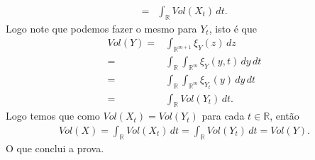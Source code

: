 \begin{homeworkProblem}[Seção 4-4]
\begin{solution}
\begin{align*}
      =&\int_{\mathbb{R}}Vol(X_t)\,dt.
    \end{align*}
    Logo note que podemos fazer o mesmo para $Y_t$, isto é que
    \begin{align*}
      Vol(Y)=&\int_{\mathbb{R}^{m+1}}\xi_{Y}(z)\,dz\\
      =&\int_{\mathbb{R}}\int_{\mathbb{R}^{m}}\xi_{Y}(y,t)\,dy\,dt\\
      =&\int_{\mathbb{R}}\int_{\mathbb{R}^{m}}\xi_{Y_t}(y)\,dy\,dt\\
      =&\int_{\mathbb{R}}Vol(Y_t)\,dt.
    \end{align*}
    Logo temos que como $Vol(X_t)=Vol(Y_t)$ para cada $t\in \mathbb{R}$, então 
    \begin{align*}
      Vol(X)=\int_{\mathbb{R}}Vol(X_{t})\,dt=\int_{\mathbb{R}}Vol(Y_t)\,dt=Vol(Y).
    \end{align*}
    O que conclui a prova.
  \end{solution}
\end{homeworkProblem}

